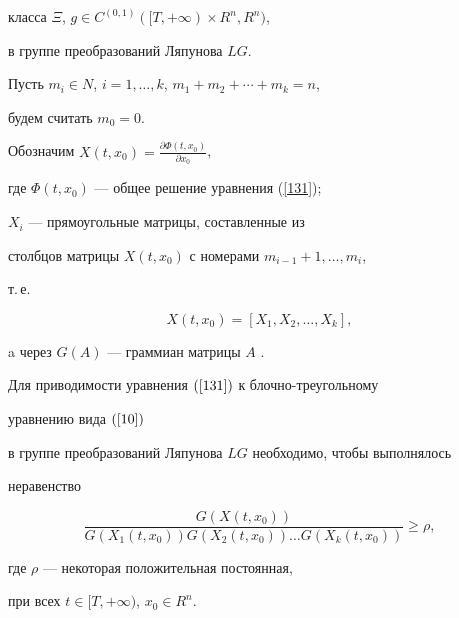 класса $\Xi$, $g\in C^{(0,1)}([T,+\infty)\times R^{n},R^{n})$,


в группе преобразований Ляпунова $LG$.





Пусть $m_{i}\in N$, $i=1,\dotsc,k$, $m_{1}+m_{2}+\dotsb+m_{k}=n$,


будем считать $m_{0}=0$.


Обозначим $X(t,x_{0})=\frac{\partial \Phi(t,x_{0})}{\partial x_{0}}$,


где $\Phi(t,x_{0})$ --- общее решение уравнения (\ref{131});


$X_{i}$ --- прямоугольные матрицы, составленные из


столбцов матрицы $X(t,x_{0})$ с номерами $m_{i-1}+1,\dotsc,m_{i}$,


т.\,е.


$$


X(t,x_{0})=[X_{1},X_{2},\dotsc,X_{k}],


$$


a через $G(A)$ --- граммиан матрицы $A$ \cite{BilTe}.





\begin{thm}


Для приводимости уравнения $(\ref{131})$ к блочно-треугольному


уравнению вида $(\ref{10})$


в группе преобразований Ляпунова $LG$ необходимо, чтобы выполнялось


неравенство


\begin{equation}


\label{1380}


\frac{G(X(t,x_{0}))}{G(X_{1}(t,x_{0}))G(X_{2}(t,x_{0}))\dotsc


G(X_{k}(t,x_{0}))}\geq\rho,


\end{equation}


где $\rho$ --- некоторая положительная постоянная,


при всех $t\in [T,+\infty)$, $x_{0}\in R^{n}$.


\end{thm}





